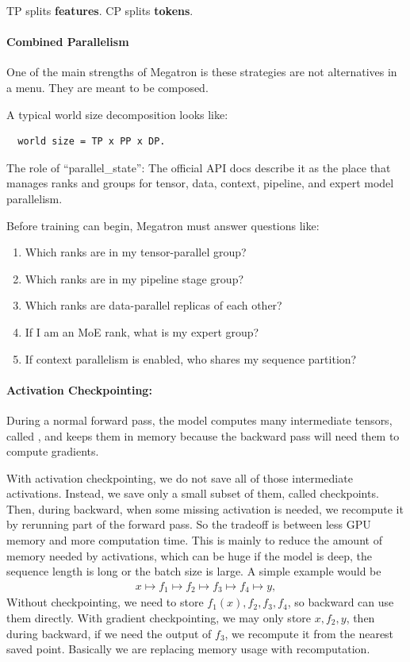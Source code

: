 \documentclass[11pt]{article}  %
\begin{document}
TP splits \textbf{features}. CP splits \textbf{tokens}.


\paragraph{Combined Parallelism}
One of the main strengths of Megatron is these strategies are not alternatives in a menu.
They are meant to be composed.

A typical world size decomposition looks like: 
\begin{verbatim}
  world size = TP x PP x DP.
\end{verbatim}


The role of ``parallel\_state'': The official API docs describe it as the place that manages ranks and groups for tensor, data, context, pipeline, and expert model parallelism.

Before training can begin, Megatron must answer questions like:
\begin{enumerate}
  \item Which ranks are in my tensor-parallel group?
  \item Which ranks are in my pipeline stage group?
  \item Which ranks are data-parallel replicas of each other?
  \item If I am an MoE rank, what is my expert group?
  \item If context parallelism is enabled, who shares my sequence partition?
\end{enumerate}


\paragraph{Activation Checkpointing:}
During a normal forward pass, the model computes many intermediate tensors, called , and keeps them in memory because the backward pass will need them to compute gradients.

With activation checkpointing, we do not save all of those intermediate activations.
Instead, we save only a small subset of them, called checkpoints.
Then, during backward, when some missing activation is needed, we recompute it by rerunning part of the forward pass.
So the tradeoff is between less GPU memory and more computation time.
This is mainly to reduce the amount of memory needed by activations, which can be huge if the model is deep, the sequence length is long or the batch size is large.
A simple example would be 
\begin{align*}
  x \mapsto f_1 \mapsto f_2 \mapsto f_3 \mapsto f_4 \mapsto y,
\end{align*}
Without checkpointing, we need to store $f_1(x), f_2, f_3,  f_4$, so backward can use them directly.
With gradient checkpointing, we may only store $x, f_2, y$, then during backward, if we need the output of $f_3$, we recompute it from the nearest saved point.
Basically we are replacing memory usage with recomputation.
\end{document}
